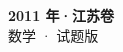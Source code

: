 \documentclass[zihao=-4, a4paper]{ctexart}
\begin{document}
\begin{center}
  {\Large\bfseries 2011 年·江苏卷}\\[4pt]
  {\large 数学 · 试题版}
\end{center}
\medskip
{}

\end{document}
